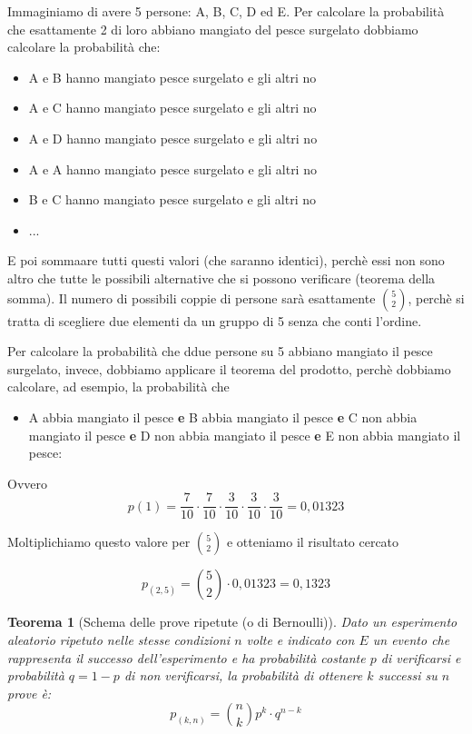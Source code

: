 \documentclass{article}     %
\newtheorem*{theorem}{Teorema}
\begin{document}
                Immaginiamo di avere 5 persone: A, B, C, D ed E. Per calcolare la probabilità che esattamente 2 di loro abbiano mangiato del pesce surgelato dobbiamo calcolare la probabilità che:
                \begin{itemize}
                    \item A e B hanno mangiato pesce surgelato e gli altri no
                    \item A e C hanno mangiato pesce surgelato e gli altri no
                    \item A e D hanno mangiato pesce surgelato e gli altri no
                    \item A e A hanno mangiato pesce surgelato e gli altri no
                    \item B e C hanno mangiato pesce surgelato e gli altri no
                    \item ...
                \end{itemize}

                E poi sommaare tutti questi valori (che saranno identici), perchè essi non sono altro che tutte le possibili alternative che si possono verificare (teorema della somma). Il numero di possibili coppie di persone sarà esattamente $\binom{5}{2}$, perchè si tratta di scegliere due elementi da un gruppo di 5 senza che conti l'ordine. 

                Per calcolare la probabilità che ddue persone su 5 abbiano mangiato il pesce surgelato, invece, dobbiamo applicare il teorema del prodotto, perchè dobbiamo calcolare, ad esempio, la probabilità che 
                \begin{itemize}
                    \item A abbia mangiato il pesce \textbf{e} B abbia mangiato il pesce \textbf{e} C non abbia mangiato il pesce \textbf{e} D non abbia mangiato il pesce \textbf{e} E non abbia mangiato il pesce:
                \end{itemize}

                Ovvero 
                \[p(1)=\frac{7}{10}\cdot\frac{7}{10}\cdot\frac{3}{10}\cdot\frac{3}{10}\cdot\frac{3}{10}=0,01323\]

                Moltiplichiamo questo valore per $\binom{5}{2}$ e otteniamo il risultato cercato

                \[p_{(2,5)}=\binom{5}{2}\cdot 0,01323=0,1323\]

                \begin{theorem}[Schema delle prove ripetute (o di Bernoulli)]
                    Dato un esperimento aleatorio ripetuto nelle stesse condizioni $n$ volte e indicato con $E$ un evento che rappresenta il successo dell'esperimento e ha probabilità costante $p$ di verificarsi e probabilità $q=1-p$ di non verificarsi, la probabilità di ottenere $k$ successi su $n$ prove è: \[p_{(k,n)}=\binom{n}{k}p^k\cdot q^{n-k}\]
                \end{theorem}
\end{document}
